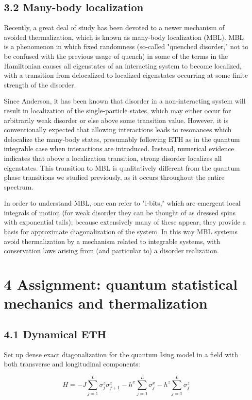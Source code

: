 \documentclass[12pt]{article}
\begin{document}
\subsection*{3.2 Many-body localization}
Recently, a great deal of study has been devoted to a newer mechanism of avoided thermalization, which is known as many-body localization (MBL). MBL is a phenomenon in which fixed randomness (so-called "quenched disorder," not to be confused with the previous usage of quench) in some of the terms in the Hamiltonian causes all eigenstates of an interacting system to become localized, with a transition from delocalized to localized eigenstates occurring at some finite strength of the disorder.

Since Anderson, it has been known that disorder in a non-interacting system will result in localization of the single-particle states, which may either occur for arbitrarily weak disorder or else above some transition value. However, it is conventionally expected that allowing interactions leads to resonances which delocalize the many-body states, presumably following ETH as in the quantum integrable case when interactions are introduced. Instead, numerical evidence indicates that above a localization transition, strong disorder localizes all eigenstates. This transition to MBL is qualitatively different from the quantum phase transitions we studied previously, as it occurs throughout the entire spectrum.

In order to understand MBL, one can refer to "l-bits," which are emergent local integrals of motion (for weak disorder they can be thought of as dressed spins with exponential tails); because extensively many of these appear, they provide a basis for approximate diagonalization of the system. In this way MBL systems avoid thermalization by a mechanism related to integrable systems, with conservation laws arising from (and particular to) a disorder realization.

\section*{4 Assignment: quantum statistical mechanics and thermalization}
\subsection*{4.1 Dynamical ETH}
Set up dense exact diagonalization for the quantum Ising model in a field with both transverse and longitudinal components:


\begin{equation*}
H=-J \sum_{j=1}^{L} \sigma_{j}^{z} \sigma_{j+1}^{z}-h^{x} \sum_{j=1}^{L} \sigma_{j}^{x}-h^{z} \sum_{j=1}^{L} \sigma_{j}^{z} \tag{8}
\end{equation*}
\end{document}

